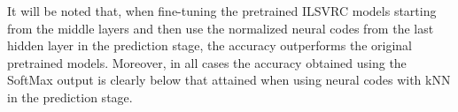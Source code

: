 \documentclass[final, twocolumn]{elsarticle}
\begin{document}
It will be noted that, when fine-tuning the pretrained ILSVRC models starting from the middle layers and then use the normalized neural codes from the last hidden layer in the prediction stage, the accuracy outperforms the original pretrained models. Moreover, in all cases the accuracy obtained using the SoftMax output is clearly below that attained when using neural codes with kNN in the prediction stage. 

\begin{table}
\renewcommand{\arraystretch}{1}
\centering
{}
\caption{Top-1 accuracy using the SoftMax output (without kNN) for the different models and training strategies evaluated.}
\label{tab:dnn_train}
\end{table}
\end{document}
